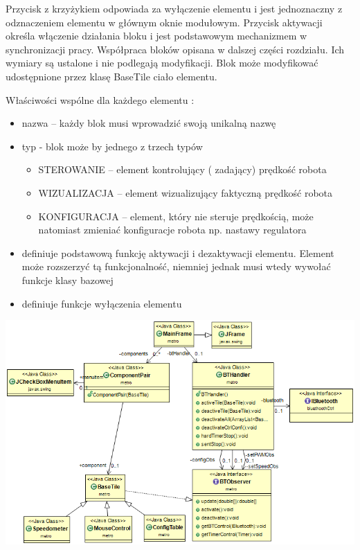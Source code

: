 \documentclass[eng,printmode]{mgr}
\begin{document}
Przycisk z krzyżykiem odpowiada za wyłączenie elementu i jest jednoznaczny z odznaczeniem elementu w głównym oknie modułowym. Przycisk aktywacji określa włączenie działania bloku i jest podstawowym mechanizmem w synchronizacji pracy. Współpraca bloków opisana w dalszej części rozdziału. Ich wymiary są ustalone i nie podlegają modyfikacji. Blok może modyfikować udostępnione przez klasę BaseTile ciało elementu.

Właściwości wspólne dla każdego elementu :
\begin{itemize}
  \item nazwa – każdy blok musi wprowadzić swoją unikalną nazwę
  \item typ  - blok może by jednego z trzech typów
  \begin{itemize}
    \item STEROWANIE – element kontrolujący ( zadający) prędkość robota
    \item WIZUALIZACJA – element wizualizujący faktyczną prędkość robota
    \item KONFIGURACJA – element, który nie steruje prędkością, może natomiast zmieniać konfiguracje robota np. nastawy regulatora
  \end{itemize}
  \item definiuje podstawową funkcję aktywacji i dezaktywacji elementu. Element może rozszerzyć tą funkcjonalność, niemniej jednak musi wtedy wywołać funkcje klasy bazowej
  \item definiuje funkcje wyłączenia elementu
\end{itemize}

\begin{center}
  \includegraphics[width=1\textwidth]{images/metro}
\end{center}
\end{document}
